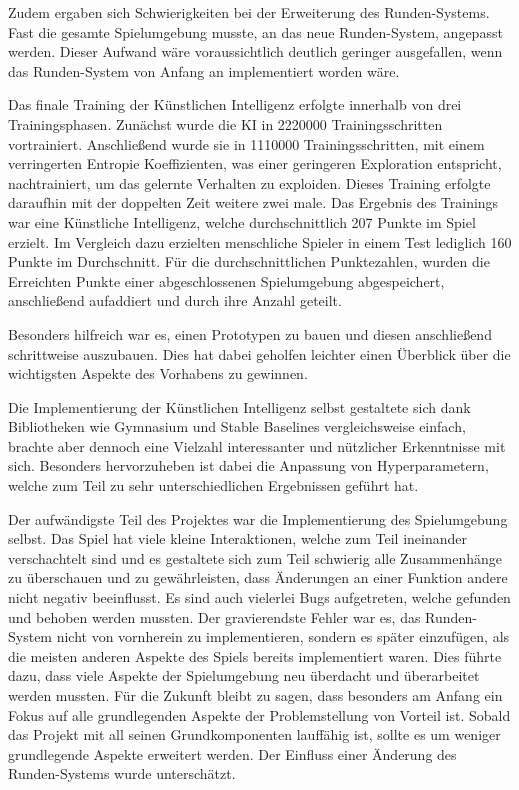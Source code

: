 Zudem ergaben sich Schwierigkeiten bei der Erweiterung des Runden-Systems. Fast die gesamte Spielumgebung musste, an das neue Runden-System, angepasst werden. Dieser Aufwand wäre voraussichtlich deutlich geringer ausgefallen, wenn das Runden-System von Anfang an implementiert worden wäre.

Das finale Training der Künstlichen Intelligenz erfolgte innerhalb von drei Trainingsphasen. Zunächst wurde die KI in 2220000 Trainingsschritten vortrainiert. Anschließend wurde sie in 1110000 Trainingsschritten, mit einem verringerten Entropie Koeffizienten, was einer geringeren Exploration entspricht, nachtrainiert, um das gelernte Verhalten zu exploiden. Dieses Training erfolgte daraufhin mit der doppelten Zeit weitere zwei male. Das Ergebnis des Trainings war eine Künstliche Intelligenz, welche durchschnittlich 207 Punkte im Spiel erzielt. Im Vergleich dazu erzielten menschliche Spieler in einem Test lediglich 160 Punkte im Durchschnitt. Für die durchschnittlichen Punktezahlen, wurden die Erreichten Punkte einer abgeschlossenen Spielumgebung abgespeichert, anschließend aufaddiert und durch ihre Anzahl geteilt.

Besonders hilfreich war es, einen Prototypen zu bauen und diesen anschließend schrittweise auszubauen. Dies hat dabei geholfen leichter einen Überblick über die wichtigsten Aspekte des Vorhabens zu gewinnen. 

Die Implementierung der Künstlichen Intelligenz selbst gestaltete sich dank Bibliotheken wie Gymnasium und Stable Baselines vergleichsweise einfach, brachte aber dennoch eine Vielzahl interessanter und nützlicher Erkenntnisse mit sich. Besonders hervorzuheben ist dabei die Anpassung von Hyperparametern, welche zum Teil zu sehr unterschiedlichen Ergebnissen geführt hat. 

Der aufwändigste Teil des Projektes war die Implementierung des Spielumgebung selbst. Das Spiel hat viele kleine Interaktionen, welche zum Teil ineinander verschachtelt sind und es gestaltete sich zum Teil schwierig alle Zusammenhänge zu überschauen und zu gewährleisten, dass Änderungen an einer Funktion andere nicht negativ beeinflusst. Es sind auch vielerlei Bugs aufgetreten, welche gefunden und behoben werden mussten. Der gravierendste Fehler war es, das Runden-System nicht von vornherein zu implementieren, sondern es später einzufügen, als die meisten anderen Aspekte des Spiels bereits implementiert waren. Dies führte dazu, dass viele Aspekte der Spielumgebung neu überdacht und überarbeitet werden mussten. Für die Zukunft bleibt zu sagen, dass besonders am Anfang ein Fokus auf alle grundlegenden Aspekte der Problemstellung von Vorteil ist. Sobald das Projekt mit all seinen Grundkomponenten lauffähig ist, sollte es um weniger grundlegende Aspekte erweitert werden. Der Einfluss einer Änderung des Runden-Systems wurde unterschätzt.\\

